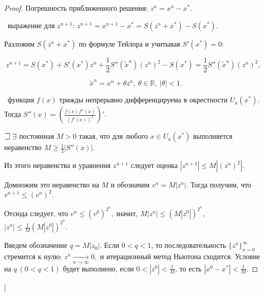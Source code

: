 \begin{proof} Погрешность приближенного решения: $z^n = x^n - x^*.$

\faEye \ выражение для $z^{n+1}$:
$z^{n + 1} = x^{n + 1} - x^* = S(z^n + x^*) - S(x^*).$

Разложим $S(z^n + x^*)$ по формуле Тейлора и учитывая $S'(x^*)=0$:

$$
    z^{n + 1} = S(x^*) + S'(x^*)z^n +
    \frac{1}{2}S''(\tilde{x}^n)\left(z^n\right)^2 - S(x^*) =
    \frac{1}{2}S''(\tilde{x}^n)(z^n)^2,
$$

$$
    ~~~\tilde{x}^n=x^n+\theta z^n, ~\theta\in\mathbb{R}, ~|\theta|<1.
$$

\mathLet \ функция $f(x)$ трижды непрерывно дифференцируема в окрестности
$U_a(x^*)$. Тогда $S''(x) = \left(\frac{f(x)f''(x)}{(f'(x))^2}\right)'.$
    

$\mathLet ~ \exists$ постоянная $M > 0$ такая, что для любого $x \in U_a(x^*)$
выполняется неравенство $M \geqslant \frac{1}{2}\left|S''(x)\right|.$

Из этого неравенства и уравнения $z^{n + 1}$ следует оценка
$|z^{n+1}| \leqslant M|(z^n)^2|.$

Домножим это неравенство на $M$ и обозначим $v^n = M|z^n|$.
Тогда получим, что $v^{n+1} \leqslant (v^n)^2.$

Отсюда следует, что $v^n \leqslant (v^0)^{2^n}$, значит,
$ M|z^n| \leqslant \left(M\left|z^0\right|\right)^{2^n},$
$ |z^n| \leqslant \frac{1}{M} \left(M\left|z^0\right|\right)^{2^n}.$

Введем обозначение $q = M|z_0|$. Если $0< q < 1$,
то последовательность $\{z^n\}_{n=0}^\infty$ стремится к нулю:
$z^n \underset{n\rightarrow\infty}\longrightarrow 0,$
и итерационный метод Ньютона сходится. Условие на $q~(0<q<1)$ будет выполнено,
если $0<|z^0|<\frac{1}{M}$, то есть $|x^0 - x^*| < \frac{1}{M}$. \end{proof}

\bigbreak
[\cite[page 99-107]{chimi}]